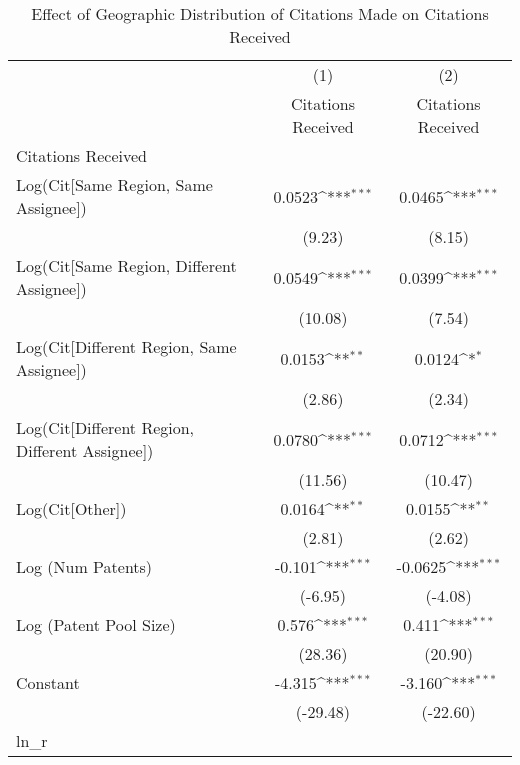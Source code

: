 {
\def\sym#1{\ifmmode^{#1}\else\(^{#1}\)\fi}
\begin{longtable}{l*{2}{c}}
\caption{Effect of Geographic Distribution of Citations Made on Citations Received \label{eflowsreg}}\\
\hline\hline\endfirsthead\hline\endhead\hline\endfoot\endlastfoot
                    &\multicolumn{1}{c}{(1)}&\multicolumn{1}{c}{(2)}\\
                    &\multicolumn{1}{c}{Citations Received}&\multicolumn{1}{c}{Citations Received}\\
\hline
Citations Received  &                     &                     \\
Log(Cit[Same Region, Same Assignee])&      0.0523\sym{***}&      0.0465\sym{***}\\
                    &      (9.23)         &      (8.15)         \\
[1em]
Log(Cit[Same Region, Different Assignee])&      0.0549\sym{***}&      0.0399\sym{***}\\
                    &     (10.08)         &      (7.54)         \\
[1em]
Log(Cit[Different Region, Same Assignee])&      0.0153\sym{**} &      0.0124\sym{*}  \\
                    &      (2.86)         &      (2.34)         \\
[1em]
Log(Cit[Different Region, Different Assignee])&      0.0780\sym{***}&      0.0712\sym{***}\\
                    &     (11.56)         &     (10.47)         \\
[1em]
Log(Cit[Other])     &      0.0164\sym{**} &      0.0155\sym{**} \\
                    &      (2.81)         &      (2.62)         \\
[1em]
Log (Num Patents)   &      -0.101\sym{***}&     -0.0625\sym{***}\\
                    &     (-6.95)         &     (-4.08)         \\
[1em]
Log (Patent Pool Size)&       0.576\sym{***}&       0.411\sym{***}\\
                    &     (28.36)         &     (20.90)         \\
[1em]
Constant            &      -4.315\sym{***}&      -3.160\sym{***}\\
                    &    (-29.48)         &    (-22.60)         \\
\hline
ln\_r                &                     &                     \\

\end{longtable}}
